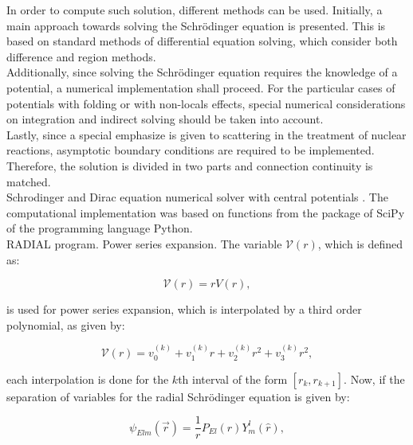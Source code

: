\documentclass[openany]{book}
\begin{document}
In order to compute such solution, different methods can be used. Initially, a main approach towards solving the Schrödinger equation is presented. This is based on standard methods of differential equation solving, which consider both difference and region methods. \\

Additionally, since solving the Schrödinger equation requires the knowledge of a potential, a numerical implementation shall proceed. For the particular cases of potentials with folding or with non-locals effects, special numerical considerations on integration and indirect solving should be taken into account. \\

Lastly, since a special emphasize is given to scattering in the treatment of nuclear reactions, asymptotic boundary conditions are required to be implemented. Therefore, the solution is divided in two parts and connection continuity is matched.  \\

Schrodinger and Dirac equation numerical solver with central potentials \cite{salvat_fernandez-varea_2019}. The computational implementation was based on functions from the package of SciPy of the programming language Python. \\

RADIAL program. Power series expansion. The variable $\mathcal{V}(r)$, which is defined as:

\begin{equation}\label{eq:numericalSolver_radialSchrodinger_Vmodified}
	\mathcal{V}(r) = r V(r),
\end{equation}

is used for power series expansion, which is interpolated by a third order polynomial,  as given by: 

\begin{equation}\label{eq:numericalSolver_radialSchrodinger_Vmodified_expansion}
	\mathcal{V}(r) = v^{(k)}_0 + v^{(k)}_1r + v^{(k)}_2r^2 + v^{(k)}_3r^2,
\end{equation}

each interpolation is done for the $k$th interval of the form $[r_k, r_{k+1}]$. Now, if the separation of variables for the radial Schrödinger equation is given by: 

\begin{equation}\label{eq:numericalSolver_radialSchrodinger_separation}
	\psi_{Elm}(\vec r) = \frac{1}{r} P_{El}(r)Y^{l}_{m}(\hat r),
\end{equation}
\end{document}
